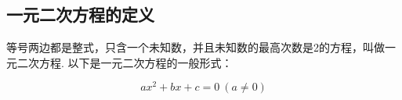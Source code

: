 \documentclass[lang=cn, 10pt, titlestyle=display, oneside]{elegantbook}
\begin{document}
\subsection{一元二次方程的定义}


\begin{definition}[一元二次方程的定义]
  
等号两边都是整式，只含一个未知数，并且未知数的最高次数是2的方程，叫做一元二次方程. 以下是一元二次方程的一般形式：

\begin{equation}
    ax^2 + bx + c = 0 \ (a \neq 0)
    \label{general_formula}
\end{equation}

 
\end{definition}
\end{document}
